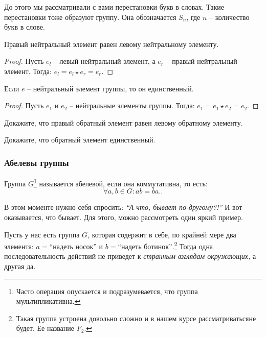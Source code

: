 \begin{example}
    До этого мы рассматривали с вами перестановки букв в словах.
    Такие перестановки тоже образуют группу. Она обозначается $S_n$, 
    где $n$ -- количество букв в слове.
\end{example}

\begin{proposition}
    Правый нейтральный элемент равен левому нейтральному элементу.
\end{proposition}
\begin{proof}
    Пусть $e_l$ -- левый нейтральный элемент, а $e_r$ -- правый нейтральный элемент. Тогда:
    \(
    e_l = e_l \star e_r = e_r.
    \)
\end{proof}
\begin{proposition}
    Если $e$ --  нейтральный элемент группы, то он единственный.
\end{proposition}
\begin{proof}
    Пусть $e_1$ и $e_2$ -- нейтральные элементы группы. Тогда:
    \(
        e_1 = e_1 \star e_2 = e_2.
    \)
\end{proof}
\begin{practice}
    Докажите, что правый обратный элемент равен левому обратному элементу.
\end{practice}
\begin{practice}
    Докажите, что обратный элемент единственный.
\end{practice}
    


\setcounter{footnote}{0}
\subsubsection{Абелевы группы}
\begin{definition}
    Группа $G$\footnote{Часто операция опускается и подразумевается, что группа мультипликативна.} 
    называется абелевой, если она коммутативна, то есть: \[
        \forall a, b \in G: ab = ba.
    .\] 
\end{definition}

\setcounter{footnote}{1}
В этом моменте нужно себя спросить: \emph{``А что, бывает по-другому?!''} И вот оказывается, что бывает.
Для этого, можно рассмотреть один яркий пример. 
\begin{example}
    Пусть у нас есть группа $G$, которая содержит в себе, по крайней мере два элемента: 
    $a = \text{``надеть носок''}$ и $b = \text{``надеть ботинок''}$.\footnote{
    Такая группа устроена довольно сложно и в нашем курсе рассматриватьсяне будет. Ее название $F_2$.}
    Тогда одна последовательность действий не приведет к \emph{странным взглядам окружающих,} а другая да.
\end{example}

